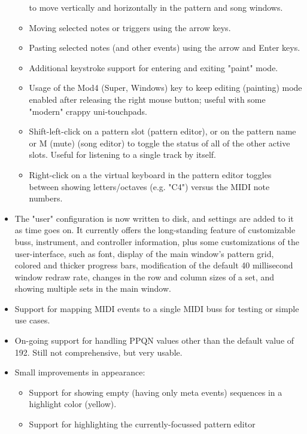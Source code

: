 \documentclass[
 11pt,
 twoside,
 a4paper,
 headinclude,
 footinclude,
 final                                 %
]{article}
\begin{document}
\begin{itemize}
\begin{itemize}
            to move vertically and horizontally in the pattern and song
            windows.
         \item Moving selected notes or triggers using the arrow keys.
         \item Pasting selected notes (and other events) using the arrow and
            Enter keys.
         \item Additional keystroke support for entering and exiting "paint"
            mode.
         \item Usage of the Mod4 (Super, Windows) key to keep editing
            (painting) mode enabled after releasing the right mouse button;
            useful with some "modern" crappy uni-touchpads.
         \item Shift-left-click on a pattern slot (pattern editor),
            or on the pattern name or M (mute) (song editor)
            to toggle the status of all of the other active slots.
            Useful for listening to a single track by itself.
         \item Right-click on a the virtual keyboard in the pattern editor
            toggles between showing letters/octaves (e.g. "C4") versus
            the MIDI note numbers.  
      \end{itemize}
      \item The "user" configuration is now written to disk, and 
         settings are added to it as time goes on.  It currently offers the
         long-standing feature of customizable buss, instrument, and controller
         information, plus some customizations of the user-interface, such as
         font, display of the main window's pattern grid, colored and thicker
         progress bars, modification of the default 40 millisecond window
         redraw rate, changes in the row and column sizes of a set, and showing
         multiple sets in the main window.
      \item Support for mapping MIDI events to a single MIDI buss for testing
         or simple use cases.
      \item On-going support for handling PPQN values other than the
         default value of 192.  Still not comprehensive, but very usable.
      \item Small improvements in appearance:
      \begin{itemize}
         \item Support for showing empty (having only meta
            events) sequences in a highlight color (yellow).
         \item Support for highlighting the currently-focussed pattern editor

\end{itemize}
\end{itemize}
\end{document}
